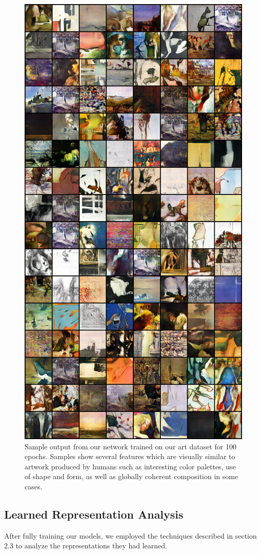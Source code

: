 \documentclass[10pt,twocolumn,letterpaper]{article}
\begin{document}
\begin{figure}[t]
	\begin{center}
		\includegraphics[width=0.825\linewidth]{art_samples.png}
	\end{center}
	\caption{Sample output from our network trained on our art dataset for 100 epochs. Samples show several features which are visually similar to artwork produced by humans such as interesting color palettes, use of shape and form, as well as globally coherent composition in some cases.}
	\label{fig:long}
	\label{fig:onecol}
\end{figure}

\subsection{Learned Representation Analysis}
After fully training our models, we employed the techniques described in section 2.3 to analyze the representations they had learned. 
\end{document}
